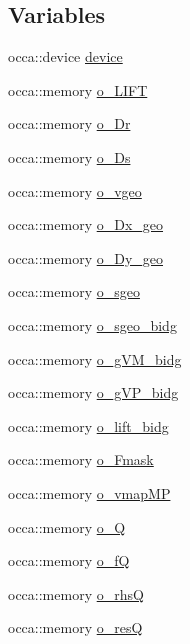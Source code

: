 \subsection*{Variables}
\begin{DoxyCompactItemize}
\item 
occa\+::device \hyperlink{a00584_a66c14c55458e7125832150ab8c8550b2}{device}
\item 
occa\+::memory \hyperlink{a00584_a74d4c3ecd0438f93bdc521321bdfff36}{o\+\_\+\+L\+I\+FT}
\item 
occa\+::memory \hyperlink{a00584_a3b234d10fa55cd79b2978baf108ca7fd}{o\+\_\+\+Dr}
\item 
occa\+::memory \hyperlink{a00584_ae59f75e43fa65382679bdc102e564695}{o\+\_\+\+Ds}
\item 
occa\+::memory \hyperlink{a00584_a6ff240e44730731028f22e84f6ba0a65}{o\+\_\+vgeo}
\item 
occa\+::memory \hyperlink{a00584_a425812a4124c44847aaee017366a427d}{o\+\_\+\+Dx\+\_\+geo}
\item 
occa\+::memory \hyperlink{a00584_a34bf7b64db70dce2401558d1247e5c03}{o\+\_\+\+Dy\+\_\+geo}
\item 
occa\+::memory \hyperlink{a00584_a1f254fb20580ce3c095d9165d3c89ec6}{o\+\_\+sgeo}
\item 
occa\+::memory \hyperlink{a00584_ac5a74fa03cd8a2842231ba4436f236e1}{o\+\_\+sgeo\+\_\+bidg}
\item 
occa\+::memory \hyperlink{a00584_a234747b8c9e6a5e60df840a718dcad95}{o\+\_\+g\+V\+M\+\_\+bidg}
\item 
occa\+::memory \hyperlink{a00584_a711820ff8510c079abe706a29166591a}{o\+\_\+g\+V\+P\+\_\+bidg}
\item 
occa\+::memory \hyperlink{a00584_aa916c51112f7004c170363a041d2faa2}{o\+\_\+lift\+\_\+bidg}
\item 
occa\+::memory \hyperlink{a00584_a9f42c84b93fc4d5fa04a65572eae2722}{o\+\_\+\+Fmask}
\item 
occa\+::memory \hyperlink{a00584_ab25761c380a4c542ca6ee3d5f3c948c8}{o\+\_\+vmap\+MP}
\item 
occa\+::memory \hyperlink{a00584_a6ea20e88b56c849c6d97eedf1190ca68}{o\+\_\+Q}
\item 
occa\+::memory \hyperlink{a00584_ac6b4ba2e1df712f72f4a76cab59ae7de}{o\+\_\+fQ}
\item 
occa\+::memory \hyperlink{a00584_ab44a93f06b3b241504e11713f1d17746}{o\+\_\+rhsQ}
\item 
occa\+::memory \hyperlink{a00584_a50104d52cbc8123125e30538c9d5af30}{o\+\_\+resQ}

\end{DoxyCompactItemize}
